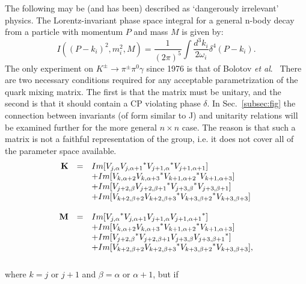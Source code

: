 \documentclass[11pt]{article}
\def\ra{\rightarrow}
\begin{document}
The following may be (and has been) described as `dangerously irrelevant'
physics. The Lorentz-invariant phase space integral for
a general n-body decay from a particle with momentum $P$
and mass $M$ is given by:
\begin{equation}
I((P - k_i)^2, m^2_i, M) = \frac{1}{(2 \pi)^5}\!
\int\!\frac{d^3 k_i}{2 \omega_i} \! \delta^4(P - k_i).
\label{eq:murnf}
\end{equation}
The only experiment on $K^{\pm} \ra \pi^{\pm} \pi^0 \gamma$ since 1976
is that of Bolotov {\it et al}.~\cite{bu}
        There are two
necessary conditions required for any acceptable
parametrization of the
quark mixing matrix. The first is that the matrix must be unitary, and the
second is that it should contain a CP violating phase $\delta$.
 In Sec.~\ref{subsec:fig} the connection between invariants (of
form similar to J) and unitarity relations
will be examined further for the more general $ n \times n $ case.
The reason is that such a matrix is not a faithful representation of the group,
i.e. it does not cover all of the parameter space available.
\begin{equation}
\begin{array}{rcl}
\bf{K} & = &  Im[V_{j, \alpha} {V_{j,\alpha + 1}}^*
{V_{j + 1,\alpha }}^* V_{j + 1, \alpha + 1} ] \\
       &   & + Im[V_{k, \alpha + 2} {V_{k,\alpha + 3}}^*
{V_{k + 1,\alpha + 2 }}^* V_{k + 1, \alpha + 3} ]  \\
       &   & + Im[V_{j + 2, \beta} {V_{j + 2,\beta + 1}}^*
{V_{j + 3,\beta }}^* V_{j + 3, \beta + 1} ]  \\
       &   & + Im[V_{k + 2, \beta + 2} {V_{k + 2,\beta + 3}}^*
{V_{k + 3,\beta + 2 }}^* V_{k + 3, \beta + 3}] \\
& & \\
\bf{M} & = &  Im[{V_{j, \alpha}}^* V_{j,\alpha + 1}
V_{j + 1,\alpha } {V_{j + 1, \alpha + 1}}^* ]  \\
       &   & + Im[V_{k, \alpha + 2} {V_{k,\alpha + 3}}^*
{V_{k + 1,\alpha + 2 }}^* V_{k + 1, \alpha + 3} ]  \\
       &   & + Im[{V_{j + 2, \beta}}^* V_{j + 2,\beta + 1}
V_{j + 3,\beta } {V_{j + 3, \beta + 1}}^* ]  \\
       &   & + Im[V_{k + 2, \beta + 2} {V_{k + 2,\beta + 3}}^*
{V_{k + 3,\beta + 2 }}^* V_{k + 3, \beta + 3}],
\\ & &
\end{array}\label{eq:spa}
\end{equation}
where $ k = j$ or $j+1$ and $\beta = \alpha$ or $\alpha+1$, but if
\end{document}
